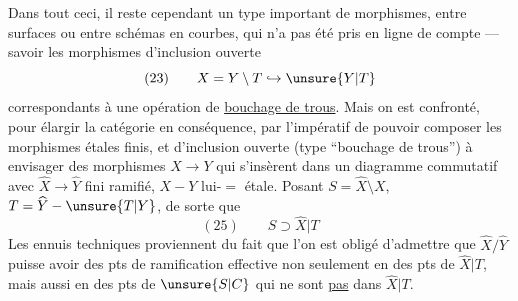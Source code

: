 Dans tout ceci, il reste cependant un
type important de  morphismes, entre
surfaces   ou entre schémas en
courbes, qui n'a pas été pris en ligne
de compte --- savoir les morphismes
d'inclusion ouverte
\[
(23)\qquad X=Y\setminus T\hookrightarrow\unsure{Y|T}
\]
correspondants à une opération de \uline{bouchage
de trous}. Mais on est confronté, pour élargir la
catégorie en conséquence, par l'impératif de
pouvoir composer les morphismes étales finis,
et d'inclusion ouverte (type ``bouchage de trous'')
à envisager des morphismes $X\longrightarrow Y$ qui
s'insèrent dans un diagramme commutatif
avec $\widehat X\longrightarrow\widehat Y$ fini ramifié, $X\mathbin{-}Y$ lui-$=$ étale.
Posant $S=\widehat X\setminus X$, $T=\widehat Y-\unsure{T|Y}$, de sorte que
\[
(25)\qquad S\supset\widehat X|T
\]
Les ennuis techniques proviennent du fait que
l'on est obligé d'admettre que $\widehat X/\widehat Y$ puisse avoir des
pts de ramification effective non seulement en
des pts de $\widehat X|T$, mais aussi en des pts de $\unsure{S|C}$ qui
ne sont \uline{pas} dans $\widehat X|T$.
